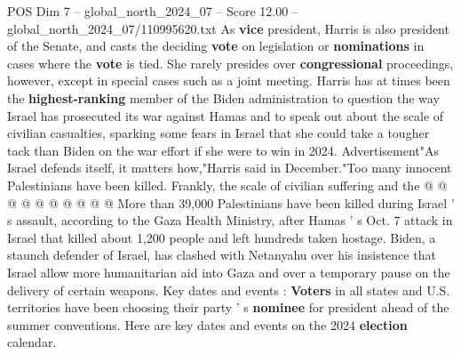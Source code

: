\begin{textsample}{POS Dim 7 – global\_north\_2024\_07 – Score 12.00 – global\_north\_2024\_07/110995620.txt}
As \textbf{vice} president, Harris is also president of the Senate, and casts the deciding \textbf{vote} on legislation or \textbf{nominations} in cases where the \textbf{vote} is tied.
She rarely presides over \textbf{congressional} proceedings, however, except in special cases such as a joint meeting.
Harris has at times been the \textbf{highest-ranking} member of the Biden administration to question the way Israel has prosecuted its war against Hamas and to speak out about the scale of civilian casualties, sparking some fears in Israel that she could take a tougher tack than Biden on the war effort if she were to win in 2024.
Advertisement"As Israel defends itself, it matters how,"Harris said in December."Too many innocent Palestinians have been killed.
Frankly, the scale of civilian suffering and the @ @ @ @ @ @ @ @ @ @ More than 39,000 Palestinians have been killed during Israel ' s assault, according to the Gaza Health Ministry, after Hamas ' s Oct. 7 attack in Israel that killed about 1,200 people and left hundreds taken hostage.
Biden, a staunch defender of Israel, has clashed with Netanyahu over his insistence that Israel allow more humanitarian aid into Gaza and over a temporary pause on the delivery of certain weapons.
Key dates and events : \textbf{Voters} in all states and U.S. territories have been choosing their party ' s \textbf{nominee} for president ahead of the summer conventions.
Here are key dates and events on the 2024 \textbf{election} calendar.

\end{textsample}
